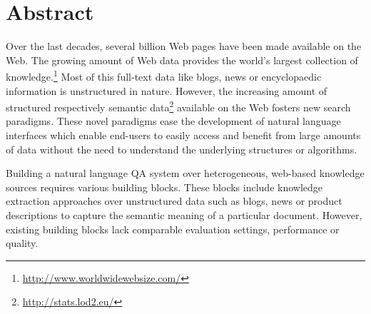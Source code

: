 \chapter*{Abstract}
Over the last decades, several billion Web pages have been made available on the Web. 
The growing amount of Web data provides the world's largest collection of knowledge.\footnote{\url{http://www.worldwidewebsize.com/}} 
Most of this full-text data like blogs, news or encyclopaedic information is unstructured in nature.
However, the increasing amount of structured respectively semantic data\footnote{\url{http://stats.lod2.eu/}} available on the Web fosters new search paradigms.
These novel paradigms ease the development of natural language interfaces which enable end-users to easily access and benefit from large amounts of data without the need to understand the underlying structures or algorithms.

Building a natural language \ac{QA} system over heterogeneous, web-based knowledge sources requires various building blocks.
These blocks include knowledge extraction approaches over unstructured data such as blogs, news or product descriptions to capture the semantic meaning of a particular document.
However, existing building blocks lack comparable evaluation settings, performance or quality. 

